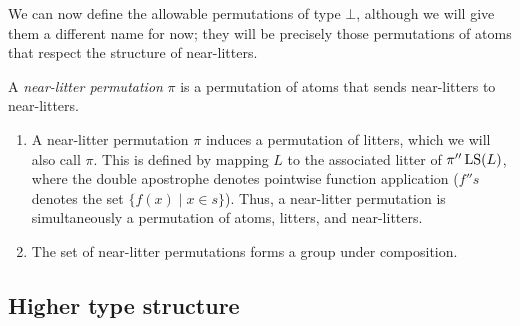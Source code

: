 We can now define the allowable permutations of type \( \bot \), although we will give them a different name for now; they will be precisely those permutations of atoms that respect the structure of near-litters.
\begin{definition}
    A \emph{near-litter permutation} \( \pi \) is a permutation of atoms that sends near-litters to near-litters.
\end{definition}
\begin{remarks}\mbox{\negthinspace}
    \begin{enumerate}
        \item A near-litter permutation \( \pi \) induces a permutation of litters, which we will also call \( \pi \).
        This is defined by mapping \( L \) to the associated litter of \( \pi '' \operatorname{LS}(L) \), where the double apostrophe denotes pointwise function application (\( f '' s \) denotes the set \( \{ f(x) \mid x \in s \} \)).
        Thus, a near-litter permutation is simultaneously a permutation of atoms, litters, and near-litters.
        \item The set of near-litter permutations forms a group under composition.
    \end{enumerate}
\end{remarks}

\subsection{Higher type structure}

